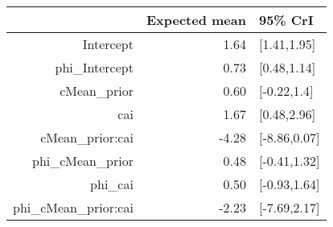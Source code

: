 \begin{tabular}{rrl}
  \hline
 & Expected mean & 95\% CrI \\ 
  \hline
Intercept & 1.64 & [1.41,1.95] \\ 
  phi\_Intercept & 0.73 & [0.48,1.14] \\ 
  cMean\_prior & 0.60 & [-0.22,1.4] \\ 
  cai & 1.67 & [0.48,2.96] \\ 
  cMean\_prior:cai & -4.28 & [-8.86,0.07] \\ 
  phi\_cMean\_prior & 0.48 & [-0.41,1.32] \\ 
  phi\_cai & 0.50 & [-0.93,1.64] \\ 
  phi\_cMean\_prior:cai & -2.23 & [-7.69,2.17] \\ 
   \hline
\end{tabular}

